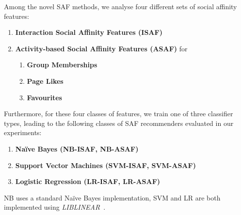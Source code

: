 

Among the novel SAF methods, we analyse four different sets of 
social affinity features:
\begin{enumerate}
\item {\bf Interaction Social Affinity Features (ISAF)}
\item {\bf Activity-based Social Affinity Features (ASAF)} for 
  \begin{enumerate}
  \item {\bf Group Memberships}
  \item {\bf Page Likes}
  \item {\bf Favourites}
  \end{enumerate}
\end{enumerate}
Furthermore, for these four classes of features, we train
one of three classifier types, leading to the following
classes of SAF recommenders evaluated in our experiments:
\begin{enumerate}
  \item {\bf Na\"{i}ve Bayes (NB-ISAF, NB-ASAF)}
  \item {\bf Support Vector Machines (SVM-ISAF, SVM-ASAF)}
  \item {\bf Logistic Regression (LR-ISAF, LR-ASAF)}
\end{enumerate}
NB uses a standard Na\"{i}ve Bayes implementation, 
SVM and LR are both implemented using \textit{LIBLINEAR}~\cite{liblinear}.


